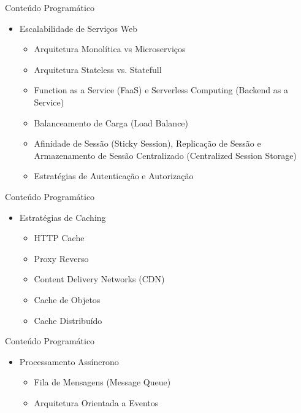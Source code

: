 \documentclass{beamer}
\begin{document}
\begin{frame}{Conteúdo Programático}\justifying
      \begin{itemize}
            \item Escalabilidade de Serviços Web
            \begin{itemize}
                  \item Arquitetura Monolítica vs Microserviços
                  \item Arquitetura Stateless vs. Statefull
                  \item Function as a Service (FaaS) e Serverless Computing (Backend as a Service)
                  \item Balanceamento de Carga (Load Balance)
                  \item Afinidade de Sessão (Sticky Session), Replicação de Sessão e Armazenamento de Sessão Centralizado (Centralized Session Storage)
                  \item Estratégias de Autenticação e Autorização 
            \end{itemize}
           
      \end{itemize}
\end{frame}
\begin{frame}{Conteúdo Programático}\justifying
      \begin{itemize}
            \item Estratégias de Caching
            \begin{itemize}
                  \item HTTP Cache 
                  \item Proxy Reverso
                  \item Content Delivery Networks (CDN) 
                  \item Cache de Objetos
                  \item Cache Distribuído
            \end{itemize}
           
      \end{itemize}
\end{frame}
\begin{frame}{Conteúdo Programático}\justifying
      \begin{itemize}
            \item Processamento Assíncrono
            \begin{itemize}
                  \item Fila de Mensagens (Message Queue)
                  \item Arquitetura Orientada a Eventos
            \end{itemize}
           
      \end{itemize}
\end{frame}
\end{document}
